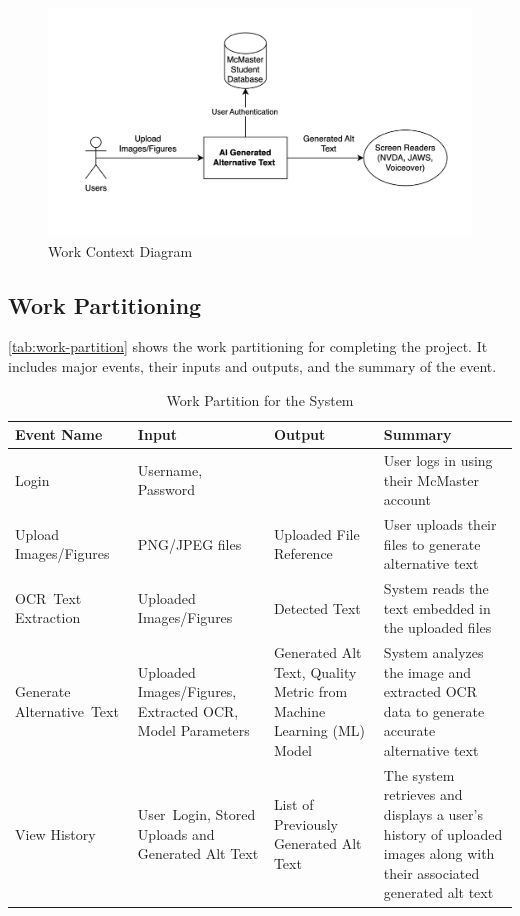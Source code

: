 \documentclass[12pt]{article}
\begin{document}
\begin{figure}[H] %
  \centering
  \includegraphics[width=\textwidth]{images/work-context-diagram.png}
  \caption{Work Context Diagram}
  \label{fig:work-context}
\end{figure}
\FloatBarrier   %

\subsection{Work Partitioning}
\autoref{tab:work-partition} shows the work partitioning for
completing the project. It includes major events,
their inputs and outputs, and the summary of the event.

\begin{table}[H]
  \centering
  \caption{Work Partition for the System}
  \label{tab:work-partition}
  \begin{tabular}{ |p{3cm}|p{3cm}|p{3cm}|p{4cm}| }
    \hline
    \textbf{Event Name} & \textbf{Input} & \textbf{Output} & \textbf{Summary} \\
    \hline
    Login & Username, Password &  & User logs in using their McMaster account \\
    \hline
    Upload \mbox{Images/Figures} & PNG/JPEG files & Uploaded File
    Reference & User uploads their files to generate alternative text \\
    \hline
    \mbox{OCR Text} \mbox{Extraction} & Uploaded
    \mbox{Images/Figures} & Detected Text & System reads the text
    embedded in the uploaded files \\
    \hline
    Generate \mbox{Alternative Text} & Uploaded
    \mbox{Images/Figures}, Extracted OCR, Model Parameters &
    Generated Alt Text, Quality Metric from Machine Learning (ML)
    Model & System analyzes the image and extracted OCR data to
    generate accurate alternative text \\
    \hline
    View History & \mbox{User Login,} Stored Uploads and Generated
    Alt Text & List of Previously Generated Alt Text & The system
    retrieves and displays a user’s history of uploaded images along
    with their associated generated alt text \\
    \hline
  \end{tabular}
\end{table}
\end{document}

